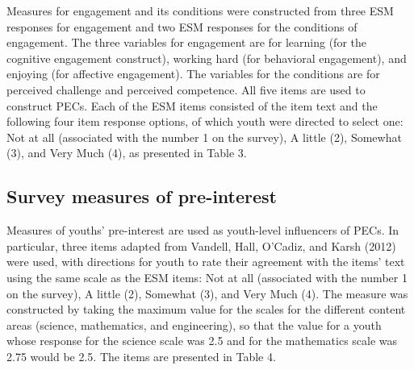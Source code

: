 \documentclass[]{book}
\theoremstyle{definition}
\theoremstyle{definition}
\theoremstyle{definition}
\theoremstyle{remark}
\begin{document}
Measures for engagement and its conditions were constructed from three
ESM responses for engagement and two ESM responses for the conditions of
engagement. The three variables for engagement are for learning (for the
cognitive engagement construct), working hard (for behavioral
engagement), and enjoying (for affective engagement). The variables for
the conditions are for perceived challenge and perceived competence. All
five items are used to construct PECs. Each of the ESM items consisted
of the item text and the following four item response options, of which
youth were directed to select one: Not at all (associated with the
number 1 on the survey), A little (2), Somewhat (3), and Very Much (4),
as presented in Table 3.

\begin{table}

\caption{\label{tab:unnamed-chunk-4}ESM measures for profiles of engagement and its conditions (PECs)}
\centering
{}
\end{table}

\subsection{Survey measures of
pre-interest}\label{survey-measures-of-pre-interest}

Measures of youths' pre-interest are used as youth-level influencers of
PECs. In particular, three items adapted from Vandell, Hall, O'Cadiz,
and Karsh (2012) were used, with directions for youth to rate their
agreement with the items' text using the same scale as the ESM items:
Not at all (associated with the number 1 on the survey), A little (2),
Somewhat (3), and Very Much (4). The measure was constructed by taking
the maximum value for the scales for the different content areas
(science, mathematics, and engineering), so that the value for a youth
whose response for the science scale was 2.5 and for the mathematics
scale was 2.75 would be 2.5. The items are presented in Table 4.
\end{document}
